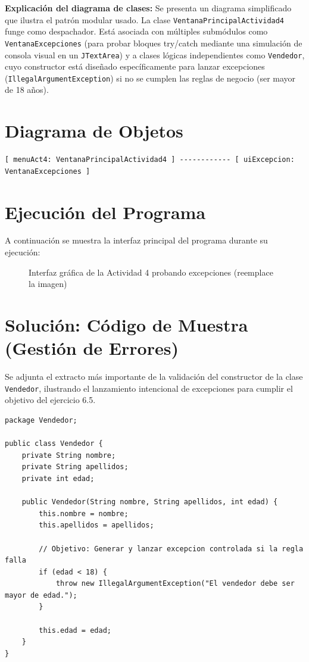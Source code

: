 \documentclass[12pt,a4paper]{article}
\begin{document}
\textbf{Explicación del diagrama de clases:}
Se presenta un diagrama simplificado que ilustra el patrón modular usado. La clase \texttt{VentanaPrincipalActividad4} funge como despachador. Está asociada con múltiples submódulos como \texttt{VentanaExcepciones} (para probar bloques try/catch mediante una simulación de consola visual en un \texttt{JTextArea}) y a clases lógicas independientes como \texttt{Vendedor}, cuyo constructor está diseñado específicamente para lanzar excepciones (\texttt{IllegalArgumentException}) si no se cumplen las reglas de negocio (ser mayor de 18 años).

\section{Diagrama de Objetos}
\begin{verbatim}
[ menuAct4: VentanaPrincipalActividad4 ] ------------ [ uiExcepcion: VentanaExcepciones ]
\end{verbatim}

\section{Ejecución del Programa}
A continuación se muestra la interfaz principal del programa durante su ejecución:

\begin{figure}[h]
    \centering
    \vspace{4cm} 
    \caption{Interfaz gráfica de la Actividad 4 probando excepciones (reemplace la imagen)}
\end{figure}

\section{Solución: Código de Muestra (Gestión de Errores)}
Se adjunta el extracto más importante de la validación del constructor de la clase \texttt{Vendedor}, ilustrando el lanzamiento intencional de excepciones para cumplir el objetivo del ejercicio 6.5.

\begin{lstlisting}[caption={Clase Vendedor.java}]
package Vendedor;

public class Vendedor {
    private String nombre;
    private String apellidos;
    private int edad;

    public Vendedor(String nombre, String apellidos, int edad) {
        this.nombre = nombre;
        this.apellidos = apellidos;
        
        // Objetivo: Generar y lanzar excepcion controlada si la regla falla
        if (edad < 18) {
            throw new IllegalArgumentException("El vendedor debe ser mayor de edad.");
        }
        
        this.edad = edad;
    }
}
\end{lstlisting}
\end{document}

